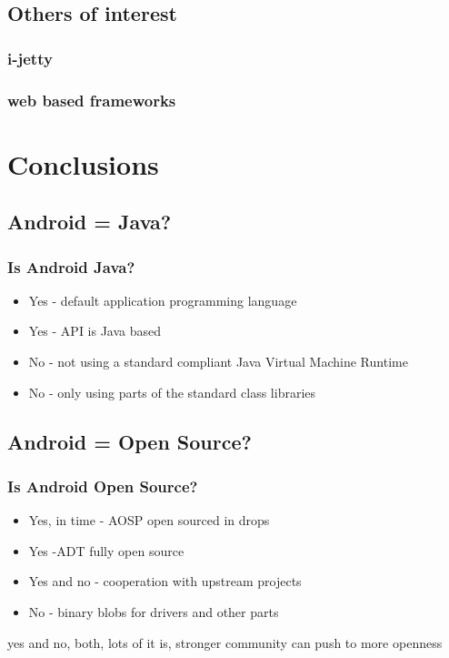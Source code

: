 \documentclass{beamer}
\begin{document}
  \subsection{Others of interest}  

    \begin{frame}
      \frametitle{i-jetty}
    \end{frame}

    \begin{frame}
      \frametitle{web based frameworks}
    \end{frame}

\section{Conclusions}

  \subsection{Android = Java?}
    \begin{frame}
      \frametitle{Is Android Java?}
      \begin{itemize}
      \item<1-> Yes - default application programming language
      \item<2-> Yes - API is Java based
      \item<3-> No - not using a standard compliant Java Virtual Machine Runtime
      \item<4-> No - only using parts of the standard class libraries
      \end{itemize}
    \end{frame}

  \subsection{Android = Open Source?}
    \begin{frame}
      \frametitle{Is Android Open Source?}
      \begin{itemize}
       \item<1-> Yes, in time - AOSP open sourced in drops
       \item<2-> Yes -ADT fully open source
       \item<3-> Yes and no - cooperation with upstream projects
       \item<4-> No - binary blobs for drivers and other parts
      \end{itemize}

    yes and no, both, lots of it is, stronger community can push to more openness

    \end{frame}
\end{document}
